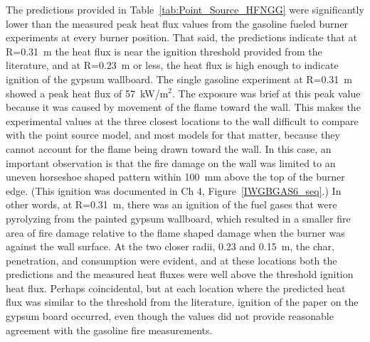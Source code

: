 \documentclass[twoside]{uocthesis}
\begin{document}
{The predictions provided in Table~\ref{tab:Point_Source_HFNGG} were significantly lower than the measured peak heat flux values from the gasoline fueled burner experiments at every burner position.  That said, the predictions indicate that at R=0.31~m the heat flux is near the ignition threshold provided from the literature, and at R=0.23~m or less, the heat flux is high enough to indicate ignition of the gypsum wallboard.  The single gasoline experiment at R=0.31~m showed a peak heat flux of 57~kW/m$^2$.  The exposure was brief at this peak value because it was caused by movement of the flame toward the wall.  This makes the experimental values at the three closest locations to the wall difficult to compare with the point source model, and most models for that matter, because they cannot account for the flame being drawn toward the wall.  In this case, an important observation is that the fire damage on the wall was limited to an uneven horseshoe shaped pattern within 100~mm above the top of the burner edge.  (This ignition was documented in Ch 4, Figure~\ref{IWGBGAS6_seq}.) In other words, at R=0.31~m, there was an ignition of the fuel gases that were pyrolyzing from the painted gypsum wallboard, which resulted in a smaller fire area of fire damage relative to the flame shaped damage when the burner was against the wall surface.  At the two closer radii, 0.23 and 0.15~m, the char, penetration, and consumption were evident, and at these locations both the predictions and the measured heat fluxes were well above the threshold ignition heat flux.  Perhaps coincidental, but at each location where the predicted heat flux was similar to the threshold from the literature, ignition of the paper on the gypsum board occurred, even though the values did not provide reasonable agreement with the gasoline fire measurements.                          

}
\end{document}
